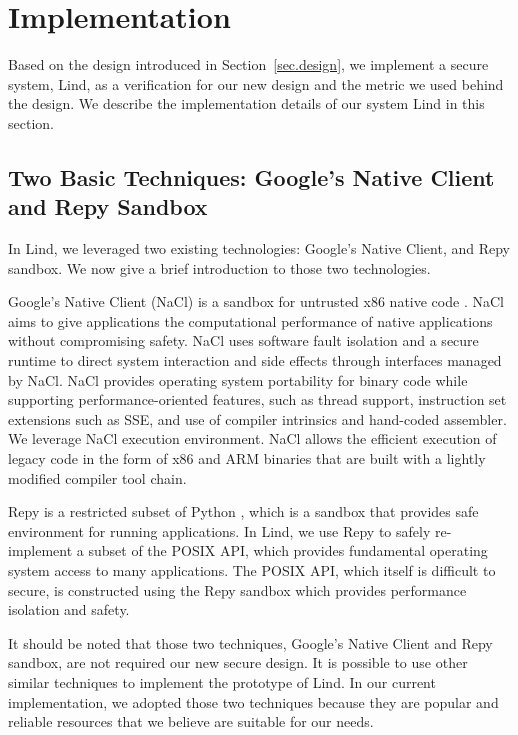 \section{Implementation}
\label{sec.implementation}

Based on the design introduced in Section~\ref{sec.design}, we implement a secure system, Lind, as 
a verification for our new design and the metric we used behind the design. We describe the 
implementation details of our system Lind in this section. 

\subsection{Two Basic Techniques: Google's Native Client and Repy Sandbox}
In Lind, we leveraged two existing technologies: Google's Native Client, 
and Repy sandbox. We now give a brief introduction to those two technologies.

Google's Native Client (NaCl) is a sandbox for untrusted x86 native code \cite{NaCl:09}. 
NaCl aims to give applications the computational performance of native applications 
without compromising safety. NaCl uses software fault isolation 
and a secure runtime to direct system interaction and side effects through interfaces managed by NaCl. 
NaCl provides operating system portability for binary code 
while supporting performance-oriented features, 
such as thread support, instruction set extensions such as SSE, and use of compiler intrinsics and 
hand-coded assembler. We leverage NaCl execution environment. NaCl allows the efficient execution of legacy code 
in the form of x86 and ARM binaries that are built with a lightly modified compiler tool chain.

Repy is a restricted subset of Python \cite{Repy:10}, which is a sandbox that 
provides safe environment for running applications.
%
In Lind, we use Repy to safely re-implement a subset of the POSIX API, which provides 
fundamental operating system access to many applications. The POSIX API, which itself is difficult to secure, 
is constructed using the Repy sandbox which provides performance isolation and safety. 

It should be noted that those two techniques, Google's Native Client and Repy sandbox, are not required
our new secure design. It is possible to use other similar techniques to implement the prototype of Lind. 
In our current implementation, we adopted those two techniques because they are popular and reliable 
resources that we believe are suitable for our needs. 

